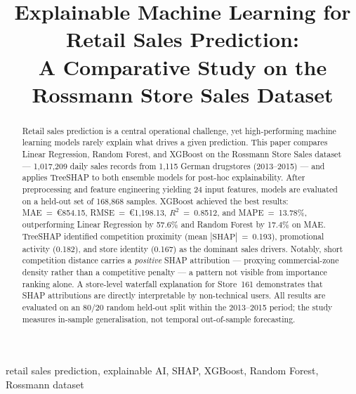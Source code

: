 \documentclass[conference]{IEEEtran}
\begin{document}
\title{Explainable Machine Learning for Retail Sales Prediction:\\A Comparative Study on the Rossmann Store Sales Dataset}

\author{
}

\maketitle

\begin{abstract}
Retail sales prediction is a central operational challenge, yet high-performing machine learning models rarely explain what drives a given prediction. This paper compares Linear Regression, Random Forest, and XGBoost on the Rossmann Store Sales dataset — 1,017,209 daily sales records from 1,115 German drugstores (2013--2015) — and applies TreeSHAP to both ensemble models for post-hoc explainability. After preprocessing and feature engineering yielding 24 input features, models are evaluated on a held-out set of 168,868 samples. XGBoost achieved the best results: MAE~=~\euro854.15, RMSE~=~\euro1,198.13, $R^{2}$~=~0.8512, and MAPE~=~13.78\%, outperforming Linear Regression by 57.6\% and Random Forest by 17.4\% on MAE. TreeSHAP identified competition proximity (mean $|\text{SHAP}|$~=~0.193), promotional activity (0.182), and store identity (0.167) as the dominant sales drivers. Notably, short competition distance carries a \emph{positive} SHAP attribution — proxying commercial-zone density rather than a competitive penalty — a pattern not visible from importance ranking alone. A store-level waterfall explanation for Store~161 demonstrates that SHAP attributions are directly interpretable by non-technical users. All results are evaluated on an 80/20 random held-out split within the 2013--2015 period; the study measures in-sample generalisation, not temporal out-of-sample forecasting.
\end{abstract}

\begin{IEEEkeywords}
retail sales prediction, explainable AI, SHAP, XGBoost, Random Forest, Rossmann dataset
\end{IEEEkeywords}

\end{document}
